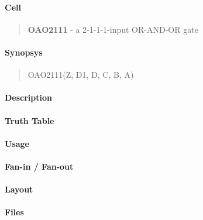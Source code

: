 \label{OAO2111}
\paragraph{Cell}
\begin{quote}
    \textbf{OAO2111} - a 2-1-1-1-input OR-AND-OR gate
\end{quote}

\paragraph{Synopsys}
\begin{quote}
    OAO2111(Z, D1, D, C, B, A)
\end{quote}

\paragraph{Description}

%

\paragraph{Truth Table}
%

\paragraph{Usage}

\paragraph{Fan-in / Fan-out}

\paragraph{Layout}

\paragraph{Files}
